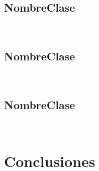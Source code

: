 \subsection{NombreClase}

\begin{lstlisting}[language=Java, caption=NombreClase]
 
\end{lstlisting}


\subsection{NombreClase}

\begin{lstlisting}[language=Java, caption=NombreClase]
 
\end{lstlisting}


\subsection{NombreClase}

\begin{lstlisting}[language=Java, caption=NombreClase]
 
\end{lstlisting}


\section{Conclusiones}

